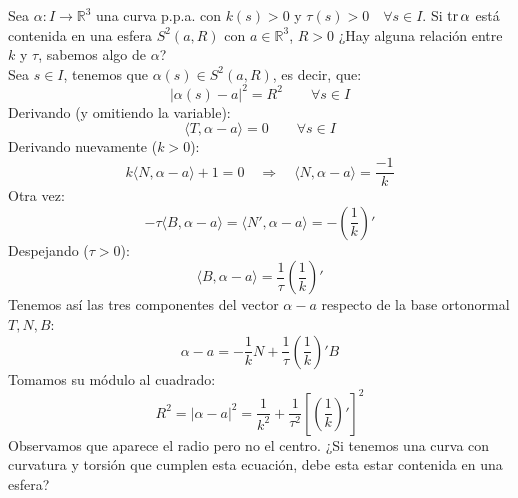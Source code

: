 \begin{ejemplo}
    Sea $\alpha:I\to \mathbb{R}^3$ una curva p.p.a. con $k(s)>0$ y $\tau(s)>0\quad \forall s\in I$. Si $\operatorname{tr}\alpha$ está contenida en una esfera $S^2(a,R)$ con $a\in \mathbb{R}^3$, $R>0$ ¿Hay alguna relación entre $k$ y $\tau$, sabemos algo de $\alpha$?\\

    \noindent
    Sea $s\in I$, tenemos que $\alpha(s)\in S^2(a,R)$, es decir, que:
    \begin{equation*}
        |\alpha(s)-a|^2 = R^2 \qquad \forall s\in I
    \end{equation*}
    Derivando (y omitiendo la variable):
    \begin{equation*}
        \boxed{\langle T,\alpha-a \rangle  = 0} \qquad \forall s\in I
    \end{equation*}
    Derivando nuevamente ($k>0$):
    \begin{equation*}
        k \langle N,\alpha-a \rangle + 1 = 0  \quad\Longrightarrow\quad \boxed{\langle N,\alpha-a \rangle  = \frac{-1}{k}}
    \end{equation*}
    Otra vez:
    \begin{equation*}
        -\tau \langle B,\alpha-a \rangle = \langle N',\alpha-a \rangle  = -\left(\frac{1}{k}\right)'
    \end{equation*}
    Despejando ($\tau > 0$):
    \begin{equation*}
        \boxed{\langle B,\alpha-a \rangle  = \frac{1}{\tau} \left(\frac{1}{k}\right)'}
    \end{equation*}
    Tenemos así las tres componentes del vector $\alpha-a$ respecto de la base ortonormal $T,N,B$:
    \begin{equation*}
        \alpha-a = -\frac{1}{k}N + \frac{1}{\tau}\left(\frac{1}{k}\right)'B
    \end{equation*}
    Tomamos su módulo al cuadrado:
    \begin{equation*}
        \boxed{R^2 = |\alpha-a|^2 = \frac{1}{k^2} + \frac{1}{\tau^2}\left[\left(\frac{1}{k}\right)'\right]^2}
    \end{equation*}
    Observamos que aparece el radio pero no el centro. ¿Si tenemos una curva con curvatura y torsión que cumplen esta ecuación, debe esta estar contenida en una esfera? %
\end{ejemplo}

